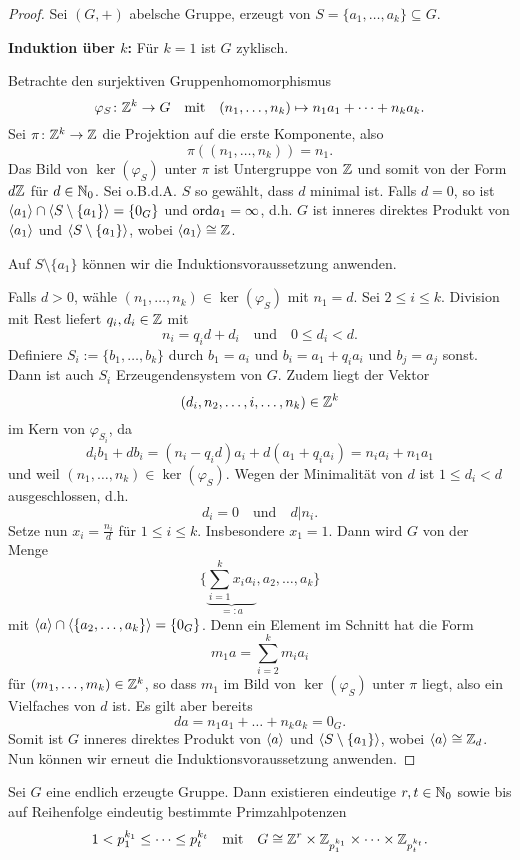 \begin{proof}
	Sei $(G, +)$ abelsche Gruppe, erzeugt von $S = \{a_1, \dots, a_k\} \subseteq G$. 
	
	\textbf{Induktion über $k$:} Für $k = 1$ ist $G$ zyklisch.
	
	Betrachte den surjektiven Gruppenhomomorphismus
	\[\varphi_S \colon \mathbb{Z}^k \to G \quad\text{mit}\quad(n_1, \dots, n_k) \mapsto n_1a_1 + \dots + n_ka_k.\]
	Sei $\pi \colon \mathbb{Z}^k \to \mathbb{Z}$ die Projektion auf die erste Komponente, also
	\[\pi((n_1, \dots, n_k)) = n_1.\]
	Das Bild von $\ker(\varphi_S)$ unter $\pi$ ist Untergruppe von $\mathbb{Z}$ und somit von der Form $d\mathbb{Z}$ für $d \in \mathbb{N}_0$. Sei o.B.d.A. $S$ so gewählt, dass $d$ minimal ist. Falls $d = 0$, so ist $\langle a_1 \rangle \cap \langle S\setminus\{a_1\} \rangle= \{0_G\}$ und $\mathrm{ord}{a_1} = \infty$, d.h. $G$ ist inneres direktes Produkt von $\langle a_1 \rangle$ und $\langle S\setminus\{a_1\} \rangle$, wobei $\langle a_1 \rangle \cong \mathbb{Z}$.
	
	Auf $S\setminus\{a_1\}$ können wir die Induktionsvoraussetzung anwenden. 
	
	Falls $d > 0$, wähle $(n_1, \dots, n_k) \in \ker(\varphi_S)$ mit $n_1 = d$. Sei $2 \leq i \leq k$. Division mit Rest liefert $q_i, d_i \in \mathbb{Z}$ mit
	\[n_i = q_i d + d_i \quad\text{und}\quad 0 \leq d_i < d.\]
	Definiere $S_i := \{b_1, \dots, b_k\}$ durch $b_1 = a_i$ und $b_i = a_1 + q_i a_i$ und $b_j = a_j$ sonst. Dann ist auch $S_i$ Erzeugendensystem von $G$. Zudem liegt der Vektor
	\[(d_i, n_2, \dots, i, \dots, n_k) \in \mathbb{Z}^k\]
	im Kern von $\varphi_{S_i}$, da
	\[d_ib_1 + db_i = (n_i - q_id)a_i + d(a_1 + q_ia_i) = n_ia_i + n_1a_1\]
	und weil $(n_1, \dots, n_k) \in \ker(\varphi_S)$. Wegen der Minimalität von $d$ ist $1 \leq d_i < d$ ausgeschlossen, d.h.
	\[d_i = 0 \quad\text{und}\quad d \big| n_i.\]
	Setze nun $x_i = \frac{n_i}{d}$ für $1 \leq i \leq k$. Insbesondere $x_1 = 1$. Dann wird $G$ von der Menge
	\[\bigg\{\underbrace{\sum_{i=1}^k x_ia_i}_{=: a} , a_2, \dots, a_k\bigg\}\]
	mit $\langle a \rangle \cap \langle \{a_2, \dots, a_k\} \rangle = \{0_G\}$. Denn ein Element im Schnitt hat die Form 
	\[m_1a = \sum_{i=2}^k m_ia_i\]
	für $(m_1, \dots, m_k) \in \mathbb{Z}^k$, so dass $m_1$ im Bild von $\ker(\varphi_S)$ unter $\pi$ liegt, also ein Vielfaches von $d$ ist. Es gilt aber bereits
	\[da = n_1 a_1 + \dots + n_ka_k = 0_G.\]
	Somit ist $G$ inneres direktes Produkt von $\langle a \rangle$ und $\langle S \setminus \{a_1\} \rangle$, wobei  $\langle a \rangle \cong \mathbb{Z}_d$. Nun können wir erneut die Induktionsvoraussetzung anwenden.
\end{proof}
\begin{kor}\label{kor2_12}
	Sei $G$ eine endlich erzeugte Gruppe. Dann existieren eindeutige $r,t \in \mathbb{N}_0$ sowie bis auf Reihenfolge eindeutig bestimmte Primzahlpotenzen 
	\[1 < p_1^{k_1} \leq \dots \leq p_t^{k_t} \quad\text{mit}\quad G \cong \mathbb{Z}^r \times \mathbb{Z}_{p_1^{k_1}} \times \dots \times \mathbb{Z}_{p_t^{k_t}}.\]
\end{kor}
